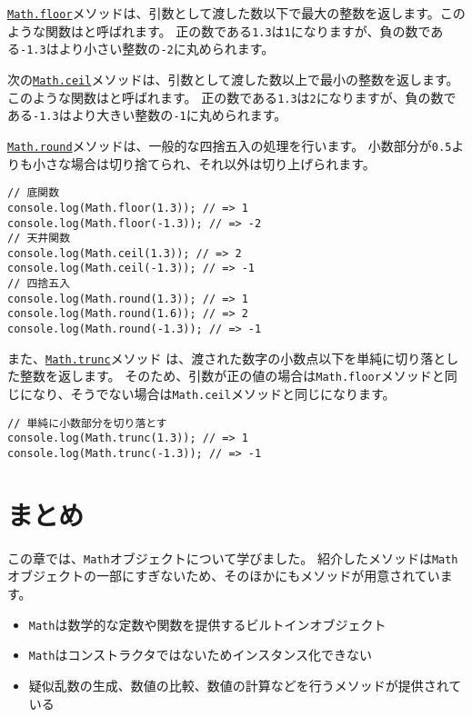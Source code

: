 \href{https://developer.mozilla.org/ja/docs/Web/JavaScript/Reference/Global_Objects/Math/floor}{\texttt{Math.floor}}メソッドは、引数として渡した数以下で最大の整数を返します。このような関数は\textbf{}と呼ばれます。
正の数である\texttt{1.3}は\texttt{1}になりますが、負の数である\texttt{-1.3}はより小さい整数の\texttt{-2}に丸められます。

次の\href{https://developer.mozilla.org/ja/docs/Web/JavaScript/Reference/Global_Objects/Math/ceil}{\texttt{Math.ceil}}メソッドは、引数として渡した数以上で最小の整数を返します。このような関数は\textbf{}と呼ばれます。
正の数である\texttt{1.3}は\texttt{2}になりますが、負の数である\texttt{-1.3}はより大きい整数の\texttt{-1}に丸められます。

\href{https://developer.mozilla.org/ja/docs/Web/JavaScript/Reference/Global_Objects/Math/round}{\texttt{Math.round}}メソッドは、一般的な四捨五入の処理を行います。
小数部分が\texttt{0.5}よりも小さな場合は切り捨てられ、それ以外は切り上げられます。

\begin{lstlisting}
// 底関数
console.log(Math.floor(1.3)); // => 1
console.log(Math.floor(-1.3)); // => -2
// 天井関数
console.log(Math.ceil(1.3)); // => 2
console.log(Math.ceil(-1.3)); // => -1
// 四捨五入
console.log(Math.round(1.3)); // => 1
console.log(Math.round(1.6)); // => 2
console.log(Math.round(-1.3)); // => -1
\end{lstlisting}

また、\href{https://developer.mozilla.org/ja/docs/Web/JavaScript/Reference/Global_Objects/Math/trunc}{\texttt{Math.trunc}}メソッド\,\protect{}\,は、渡された数字の小数点以下を単純に切り落とした整数を返します。
そのため、引数が正の値の場合は\texttt{Math.floor}メソッドと同じになり、そうでない場合は\texttt{Math.ceil}メソッドと同じになります。

\begin{lstlisting}
// 単純に小数部分を切り落とす
console.log(Math.trunc(1.3)); // => 1
console.log(Math.trunc(-1.3)); // => -1
\end{lstlisting}

\hypertarget{conclusion}{%
\section{まとめ}\label{conclusion}}

この章では、\texttt{Math}オブジェクトについて学びました。
紹介したメソッドは\texttt{Math}オブジェクトの一部にすぎないため、そのほかにもメソッドが用意されています。

\begin{itemize}
\item
  \texttt{Math}は数学的な定数や関数を提供するビルトインオブジェクト
\item
  \texttt{Math}はコンストラクタではないためインスタンス化できない
\item
  疑似乱数の生成、数値の比較、数値の計算などを行うメソッドが提供されている
\end{itemize}
